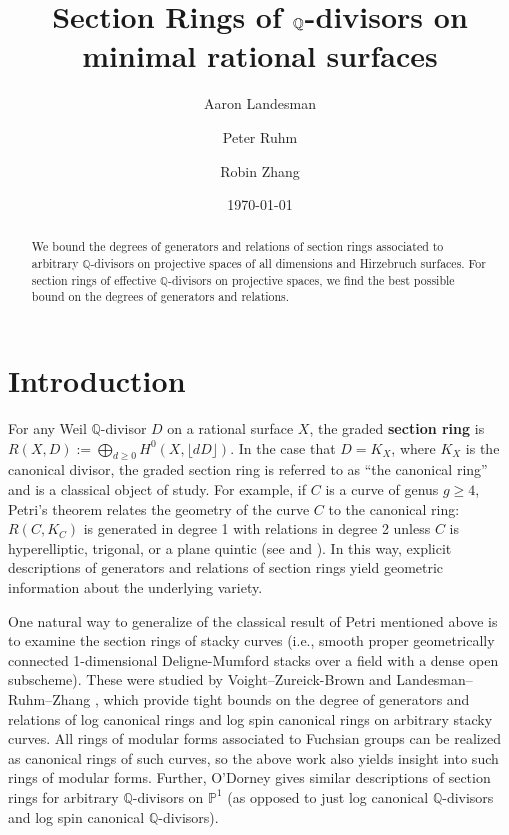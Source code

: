 \documentclass{amsart}
\title[Section Rings of $\bq$-divisors]{Section Rings of $\bq$-divisors on minimal rational surfaces}
\author{Aaron Landesman}
\author{Peter Ruhm}
\author{Robin Zhang}
\date{\today}
\theoremstyle{plain}
\theoremstyle{definition}
\theoremstyle{remark}
\numberwithin{equation}{section}
\newcommand\bq{{\mathbb Q}}
\newcommand\bp{{\mathbb P}}
\begin{document}
\begin{abstract}
 	We bound the degrees of generators and relations of
	section rings associated to arbitrary $\bq$-divisors on projective spaces of 
	all dimensions and Hirzebruch surfaces. For section rings of
	effective $\bq$-divisors on projective spaces, we find 
	the best possible bound on
	the degrees of generators and relations.
\end{abstract}

\maketitle

\section{Introduction}
\label{sec:intro}
For any Weil $\bq$-divisor $D$ on a rational surface $X$, the graded
\textbf{section ring} is $R(X, D) := \bigoplus_{d \geq 0}
H^0(X, \lfloor dD \rfloor)$.
In the case that $D = K_X$, where $K_X$ is the canonical divisor,
the graded section ring is referred to as
``the canonical ring'' and is a classical object of study.
For example, if $C$ is a curve of genus $g \geq 4$, Petri's theorem
relates the geometry of the curve $C$ to the canonical ring:
$R(C, K_C)$ is generated in degree 1 with relations in degree 2 
unless $C$ is hyperelliptic, trigonal, or a plane quintic
(see
\cite[p. 157]{saint-donat:proj} and \cite[Section 3.3]{acgh:algebraic-curves}).
In this way, explicit descriptions of generators and relations of section rings yield
geometric information about the underlying variety.

One natural way to generalize of the classical result of Petri
mentioned above is to examine the section rings of stacky curves
(i.e., smooth proper geometrically connected 1-dimensional
Deligne-Mumford stacks over a field with a dense open subscheme).
These were studied by Voight--Zureick-Brown 
\cite{vzb:stacky} and Landesman--Ruhm--Zhang \cite{lrz:spin-cring},
which provide tight bounds on the degree of generators and relations
of log canonical rings and log spin canonical rings on arbitrary
stacky curves. All rings of modular forms associated to Fuchsian
groups can be realized as canonical rings of
such curves, so the above work also yields insight into such rings
of modular forms.
Further, 
O'Dorney \cite{dorney:canonical} gives similar descriptions
of section rings for arbitrary $\bq$-divisors on $\bp^1$
(as opposed to just log canonical $\bq$-divisors and log spin canonical $\bq$-divisors).
\end{document}
